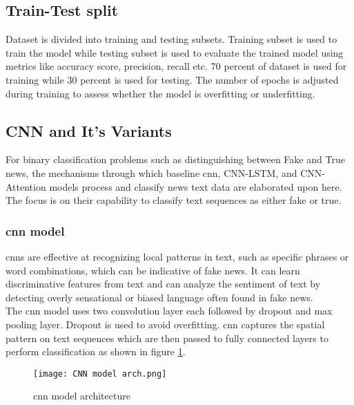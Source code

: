 \subsection{Train-Test split}

Dataset is divided into training and testing subsets. Training subset is used to train the model while testing subset is used to evaluate the trained model using metrics like accuracy score, precision, recall etc. 70 percent of dataset is used for training while 30 percent is used for testing. The number of epochs is adjusted during training to assess whether the model is overfitting or underfitting.

\subsection{CNN and It's Variants}
    
    For binary classification problems such as distinguishing between Fake and True news, the mechanisms through which baseline \ac{cnn}, CNN-LSTM, and CNN-Attention models process and classify news text data are elaborated upon here. The focus is on their capability to classify text sequences as either fake or true.

    \subsubsection{\ac{cnn} model}
    \ac{cnn}s are effective at recognizing local patterns in text, such as specific phrases or word combinations, which can be indicative of fake news. It can learn discriminative features from text and can analyze the sentiment of text by detecting overly sensational or biased language often found in fake news. \\
    
    The \ac{cnn} model uses two convolution layer each followed by dropout and max pooling layer. Dropout is used to avoid overfitting. \ac{cnn} captures the spatial pattern on text sequences which are then passed to fully connected layers to perform classification as shown in figure \ref{fig:cnn_model_architecture}. 

    \begin{figure}[h]
        \centering
        \texttt{[image: CNN model arch.png]}
        \caption{\ac{cnn} model architecture}
        \label{fig:cnn_model_architecture}
    \end{figure}

    \clearpage
    
